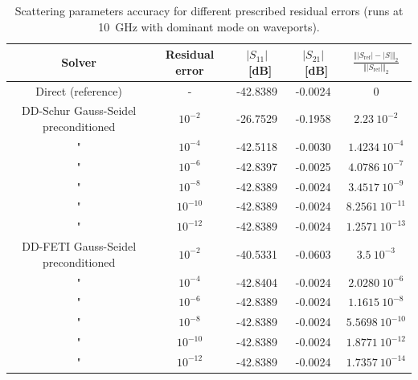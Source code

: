 \begin{table}
\begin{center}
\begin{tabular}{|c|c|c|c|c|}
\hline 
Solver & Residual error & $|S_{11}|$~[dB] & $|S_{21}|$~[dB] & $\frac{\Vert |S_\mathrm{ref}| - |S| \Vert_{2}}{\Vert|S_\mathrm{ref}|\Vert_2}$\\ 
\hline
\hline 
Direct (reference) & - & -42.8389 & -0.0024 & 0\\ \hline \hline
\setlength{\arrayrulewidth}{0.5pt}
DD-Schur Gauss-Seidel preconditioned & $10^{-2}$ & -26.7529 & -0.1958 & $2.23~10^{-2}$\\ \hline 
"& $10^{-4}$ & -42.5118 & -0.0030 & $1.4234~10^{-4}$\\ \hline 
"& $10^{-6}$ & -42.8397 & -0.0025 & $4.0786~10^{-7}$\\ \hline 
"& $10^{-8}$ & -42.8389 & -0.0024 & $3.4517~10^{-9}$\\ \hline 
"& $10^{-10}$ & -42.8389 & -0.0024 & $8.2561~10^{-11}$\\ \hline
"& $10^{-12}$ & -42.8389 & -0.0024 & $1.2571~10^{-13}$\\ \hline \hline
DD-FETI Gauss-Seidel preconditioned & $10^{-2}$ & -40.5331 & -0.0603 & $3.5~10^{-3}$\\ \hline 
"& $10^{-4}$ & -42.8404 & -0.0024 & $2.0280~10^{-6}$\\ \hline 
"& $10^{-6}$ & -42.8389 & -0.0024 & $1.1615~10^{-8}$\\ \hline 
"& $10^{-8}$ & -42.8389 & -0.0024 &  $5.5698~10^{-10}$\\ \hline 
"& $10^{-10}$ & -42.8389 & -0.0024 & $1.8771~10^{-12}$\\ \hline
"& $10^{-12}$ & -42.8389 & -0.0024 & $1.7357~10^{-14}$\\ \hline
\end{tabular}
\end{center}
\caption{Scattering parameters accuracy for different prescribed residual errors (runs at 10~GHz with dominant mode on waveports).}
\label{tab:Sacc}
\end{table}

